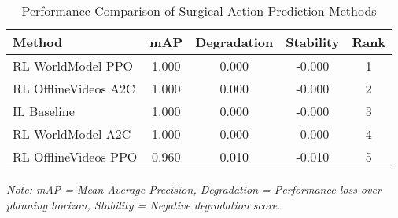 
\begin{table}[htbp]
\centering
\caption{Performance Comparison of Surgical Action Prediction Methods}
\label{tab:main_results}
\begin{tabular}{lcccc}
\toprule
\textbf{Method} & \textbf{mAP} & \textbf{Degradation} & \textbf{Stability} & \textbf{Rank} \\
\midrule
RL WorldModel PPO & 1.000 & 0.000 & -0.000 & 1 \\
RL OfflineVideos A2C & 1.000 & 0.000 & -0.000 & 2 \\
IL Baseline & 1.000 & 0.000 & -0.000 & 3 \\
RL WorldModel A2C & 1.000 & 0.000 & -0.000 & 4 \\
RL OfflineVideos PPO & 0.960 & 0.010 & -0.010 & 5 \\

\bottomrule
\end{tabular}
\footnotesize
\textit{Note: mAP = Mean Average Precision, Degradation = Performance loss over planning horizon, Stability = Negative degradation score.}
\end{table}

